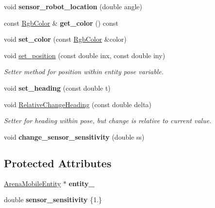 \begin{DoxyCompactItemize}
\item 
void {\bfseries sensor\+\_\+robot\+\_\+location} (double angle)\hypertarget{class_sensor_a97e17a4d4b5fb30bf81d4ad6ee363715}{}\label{class_sensor_a97e17a4d4b5fb30bf81d4ad6ee363715}

\item 
const \hyperlink{struct_rgb_color}{Rgb\+Color} \& {\bfseries get\+\_\+color} () const \hypertarget{class_sensor_af5c275ceac411cfcc0903d6d837ed3e7}{}\label{class_sensor_af5c275ceac411cfcc0903d6d837ed3e7}

\item 
void {\bfseries set\+\_\+color} (const \hyperlink{struct_rgb_color}{Rgb\+Color} \&color)\hypertarget{class_sensor_a4c7c83edd18efc4a93d3fda798dbceec}{}\label{class_sensor_a4c7c83edd18efc4a93d3fda798dbceec}

\item 
void \hyperlink{class_sensor_aa38343db9a4da55dde95cb2579204b06}{set\+\_\+position} (const double inx, const double iny)\hypertarget{class_sensor_aa38343db9a4da55dde95cb2579204b06}{}\label{class_sensor_aa38343db9a4da55dde95cb2579204b06}

\begin{DoxyCompactList}\small\item\em Setter method for position within entity pose variable. \end{DoxyCompactList}\item 
void {\bfseries set\+\_\+heading} (const double t)\hypertarget{class_sensor_a95e911a62cef5adfbb0a8ee395cfa881}{}\label{class_sensor_a95e911a62cef5adfbb0a8ee395cfa881}

\item 
void \hyperlink{class_sensor_ad93b67ee775232e4b6e939fd043f0b84}{Relative\+Change\+Heading} (const double delta)
\begin{DoxyCompactList}\small\item\em Setter for heading within pose, but change is relative to current value. \end{DoxyCompactList}\item 
void {\bfseries change\+\_\+sensor\+\_\+sensitivity} (double ss)\hypertarget{class_sensor_a52e3dc66b6aeee78893d08a9d4511fae}{}\label{class_sensor_a52e3dc66b6aeee78893d08a9d4511fae}

\end{DoxyCompactItemize}
\subsection*{Protected Attributes}
\begin{DoxyCompactItemize}
\item 
\hyperlink{class_arena_mobile_entity}{Arena\+Mobile\+Entity} $\ast$ {\bfseries entity\+\_\+}\hypertarget{class_sensor_a03559676893c5d485ba8122d5aeb9bd4}{}\label{class_sensor_a03559676893c5d485ba8122d5aeb9bd4}

\item 
double {\bfseries sensor\+\_\+sensitivity} \{1.\}\hypertarget{class_sensor_a090df848b7270a17ea41a0a28816515b}{}\label{class_sensor_a090df848b7270a17ea41a0a28816515b}

\end{DoxyCompactItemize}


